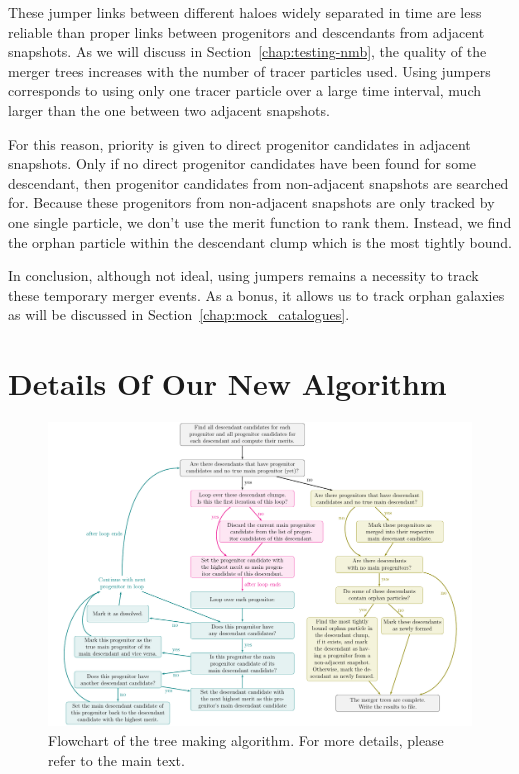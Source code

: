 These jumper links between different haloes widely separated in time
are less reliable than proper links between progenitors and
descendants from adjacent snapshots.  As we will discuss
in Section~\ref{chap:testing-nmb}, the quality of the merger trees
increases with the number of tracer particles used.  Using jumpers
corresponds to using only one tracer particle over a large time interval,
much larger than the one between two adjacent snapshots.

For this reason, priority is given to direct progenitor candidates in
adjacent snapshots.  Only if no direct progenitor candidates have been
found for some descendant, then progenitor candidates from
non-adjacent snapshots are searched for.  Because these progenitors
from non-adjacent snapshots are only tracked by one single particle,
we don't use the merit function to rank them.  Instead, we find the
orphan particle within the descendant clump which is the most tightly
bound.

In conclusion, although not ideal, using jumpers remains a necessity
to track these temporary merger events.  As a bonus, it allows us to
track orphan galaxies as will be discussed in
Section~\ref{chap:mock_catalogues}.





\section{Details Of Our New Algorithm}\label{chap:my_code}

\begin{figure}
	\includegraphics[width=\textwidth]{./images/tikz/tree_algorithm_flowchart.pdf}%
	\caption{\label{fig:flowchart} 
    	Flowchart of the tree making algorithm. For more details, please refer to the main text.
  }
\end{figure}


